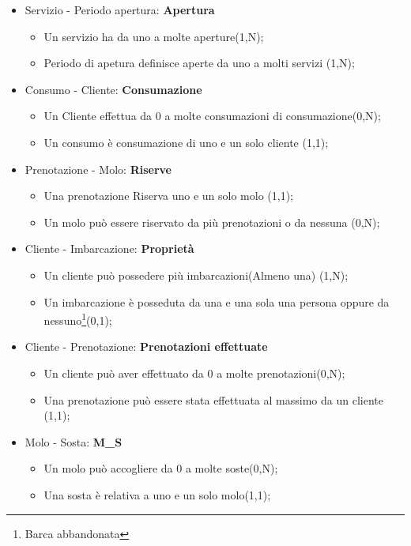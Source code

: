 \begin{itemize}
    \item Servizio - Periodo apertura: \textbf{Apertura}
    \begin{itemize}
        \item Un servizio ha da uno a molte aperture(1,N);
        \item Periodo di apetura definisce aperte da uno a molti servizi (1,N);
    \end{itemize}

    \item Consumo - Cliente: \textbf{Consumazione}
    \begin{itemize}
        \item Un Cliente effettua da 0 a molte consumazioni di consumazione(0,N);
        \item Un consumo è consumazione di uno e un solo cliente (1,1);
    \end{itemize}

    \item Prenotazione - Molo: \textbf{Riserve}
    \begin{itemize}
        \item Una prenotazione Riserva uno e un solo molo (1,1);
        \item Un molo può essere riservato da più prenotazioni o da nessuna (0,N);
    \end{itemize}

    \item Cliente - Imbarcazione: \textbf{Proprietà}
    \begin{itemize}
        \item Un cliente può possedere più imbarcazioni(Almeno una) (1,N);
        \item Un imbarcazione è posseduta da una e una sola una persona oppure da nessuno\footnote{Barca abbandonata}(0,1);
    \end{itemize}
    
    \item Cliente - Prenotazione: \textbf{Prenotazioni effettuate}
    \begin{itemize}
        \item Un cliente può aver effettuato da 0 a molte prenotazioni(0,N);
        \item Una prenotazione può essere stata effettuata al massimo da un cliente (1,1);
    \end{itemize}

    \item Molo - Sosta: \textbf{M\_S}
    \begin{itemize}
        \item Un molo può accogliere da 0 a molte soste(0,N);
        \item Una sosta è relativa a uno e un solo molo(1,1);
    \end{itemize}


\end{itemize}
